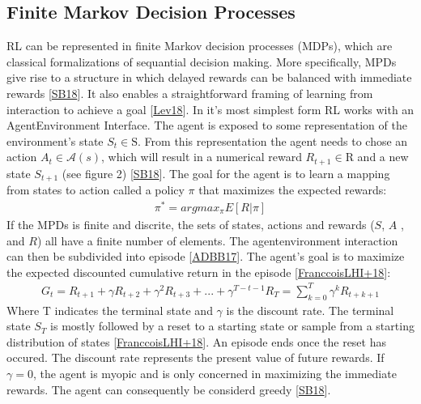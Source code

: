 \documentclass[letterpaper,10pt,english]{jupyterBook}
\begin{document}
\sphinxAtStartPar
{}


\subsection{Finite Markov Decision Processes}
\label{\detokenize{Reinforcement_learning:finite-markov-decision-processes}}
\sphinxAtStartPar
RL can be represented in finite Markov decision processes (MDPs), which are classical formalizations of sequantial decision making. More specifically, MPDs give rise to a structure in which delayed rewards can be balanced with immediate rewards {[}\hyperlink{cite.Financial_application:id55}{SB18}{]}. It also enables a straightforward framing of learning from interaction to achieve a goal {[}\hyperlink{cite.Financial_application:id49}{Lev18}{]}. In it’s most simplest form RL works with an Agent\sphinxhyphen{}Environment Interface. The agent is exposed to some representation of the environment’s state \(S_t \in \mathrm{S}\). From this representation the agent needs to chose an action \( A_t \in \mathcal{A}(s)\), which will result in a numerical reward \(R_{t+1} \in \mathrm{R} \) and a new state \(S_{t+1}\) (see figure 2) {[}\hyperlink{cite.Financial_application:id55}{SB18}{]}. The goal for the agent is to learn a mapping from states to action called a policy \(\pi\) that maximizes the expected rewards:
\begin{equation*}
\begin{split} \pi^* = argmax_{\pi} E[R|\pi] \end{split}
\end{equation*}
\sphinxAtStartPar
If the MPDs is finite and discrite, the sets of states, actions and rewards (\(S\), \(A\) , and \(R\)) all have a finite number of elements. The agent\sphinxhyphen{}environment interaction can then be subdivided into episode {[}\hyperlink{cite.Financial_application:id51}{ADBB17}{]}.  The agent’s goal is to maximize the expected discounted cumulative return in the episode {[}\hyperlink{cite.Financial_application:id56}{FranccoisLHI+18}{]}:
\begin{equation*}
\begin{split} G_t = R_{t+1} + \gamma R_{t+2} + \gamma^2 R_{t+3} + ... + \gamma^{T-t-1}R_T = \sum_{k=0}^T \gamma^k R_{t+k+1}\end{split}
\end{equation*}
\sphinxAtStartPar
Where T indicates the terminal state and \(\gamma\) is the discount rate. The terminal state \(S_T\) is mostly followed by a reset to a starting state or sample from a starting distribution of states {[}\hyperlink{cite.Financial_application:id56}{FranccoisLHI+18}{]}. An episode ends once the reset has occured. The discount rate represents the present value of future rewards. If \(\gamma = 0\), the agent is myopic and is only concerned in maximizing the immediate rewards. The agent can consequently be considerd greedy {[}\hyperlink{cite.Financial_application:id55}{SB18}{]}.
\end{document}
